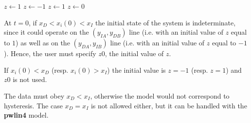 \hspace*{20ex}\begin{minipage}[t]{15cm}
\begin{algorithmic} 
    \STATE $z \gets 1$
    \STATE $z \gets -1$
\ELSE
{} 
    \STATE $z \gets 1$
\ELSE
    \STATE $z \gets 0$
\ENDIF
\ENDIF
\end{algorithmic}
\end{minipage}

\vspace{2ex}
At $t=0$, if $x_D < x_i(0) < x_I$ the initial state of the system is indeterminate, since it could operate on the $(y_{IA}, y_{DB})$ line (i.e. with an initial value of $z$ equal to $1$) as well as on the $(y_{DA}, y_{IB})$ line (i.e. with an initial value of $z$ equal to $-1$). Hence, the user must specify $z0$, the initial value of $z$. 

If $x_i(0) < x_D$ (resp. $x_i(0) > x_I$) the initial value is $z=-1$ (resp. $z=1$) and $z0$ is not used.

The data must obey $x_D < x_I$, otherwise the model would not correspond to hysteresis. The case $x_D = x_I$ is not allowed either, but it can be handled with the {\bf pwlin4} model.
